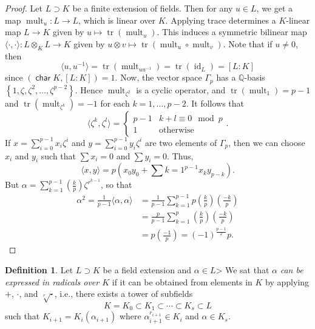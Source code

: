 \documentclass[10pt,letterpaper,cm]{nupset}
\theoremstyle{definition}
\newtheorem{definition}{Definition}[subsection]
\theoremstyle{theorem}
\theoremstyle{remark}
\newcommand{\Q}{\mathbb Q}
\newcommand{\1}{\mathbf{1}}
\newcommand{\0}{\vec 0}
\DeclareMathOperator{\Char}{\mathsf{char}}
\DeclareMathOperator{\id}{id}
\DeclareMathOperator{\tr}{tr}
\DeclareMathOperator{\mult}{mult}
\begin{document}
\begin{proof}
Let $L \supset K$ be a finite extension of fields. Then for any $u\in L$, we get a map $\mult_u : L \to L$, which is linear over $K$. Applying trace determines a $K$-linear map $L \to K$ given by $u \mapsto \tr(\mult_u)$. This induces a symmetric bilinear map $\langle \cdot, \cdot \rangle : L \otimes_K L \to K$ given by $u \otimes v \mapsto \tr(\mult_u \circ \mult_v)$. Note that if $u \ne 0$, then $$\langle u, u^{-1} \rangle = \tr(\mult_{uu^{-1}}) = \tr(\id_L) =[L:K] $$ since $(\Char{K}, [L:K])=1$. Now, the vector space $\Gamma_p$ has a $\Q$-basis $\left\{1, \zeta, \zeta^2, \ldots, \zeta^{p-2}\right\}$. Hence $\mult_{\zeta^2}$ is a cyclic operator, and $\tr(\mult_1) = p-1$ and $\tr(\mult_{\zeta^k}) = {-1}$ for each $k=1, \ldots, p-2$. It follows that $$ \langle \zeta^k, \zeta^l \rangle = \begin{cases}  p-1 & k+l \equiv 0 \mod p \\ 1 & \text{otherwise}   \end{cases}.$$ If $x = \sum_{i=0}^{p-1} x_i \zeta^i$ and $y = \sum_{i=0}^{p-1} y_i \zeta^i$ are two elements of $\Gamma_p$, then we can choose $x_i$ and $y_i$ such that $\sum x_i = 0$ and $\sum y_i= 0$. Thus, $$\langle x, y \rangle = p(x_0y_0 + \sum{k=1}^{p-1} x_k y_{p-k}).$$ But $\alpha = \sum_{k=1}^{p-1} \left(\frac{k}{p} \right) \zeta^{r^{k-1}}$, so that \begin{align*}
 \alpha^2 = \frac{1}{p-1} \langle \alpha, \alpha \rangle & = \frac{1}{p-1} \sum_{k=1}^{p-1} p \left(\frac{k}{p} \right) \left(\frac{{-}k}{p} \right) \\ &= \frac{p}{p-1} \sum_{k=1}^{p} \left(\frac{k}{p} \right) \left(\frac{{-}k}{p} \right) \\ & = p \left(\frac{-1}{p} \right) = ({-1})^{\frac{p-1}{2}}p
. \end{align*}
\end{proof}

\smallskip

\begin{definition}
Let $L \supset K$ be a field extension and $\alpha \in L$> We sat that $\alpha$ \textit{can be expressed in radicals over $K$} if it can be obtained from elements in $K$ by applying $+$, $\cdot$, and $\sqrt[r]{\cdot}$, i.e., there exists a tower of subfields $$ K = K_0 \subset K_1 \subset \cdots \subset K_s \subset L  $$ such that $K_{i+1} = K_i(\alpha_{i+1})$ where $\alpha_{i+1}^{r_{i+1}} \in K_i$ and $\alpha \in K_s$. 
\end{definition}
\end{document}

